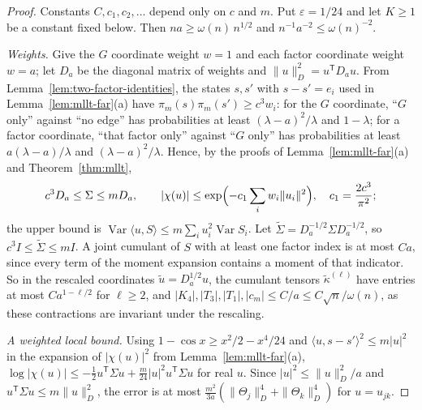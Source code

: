 \documentclass[11pt]{article}
\begin{document}
\begin{proof}
Constants \(C,c_1,c_2,\ldots\) depend only on \(c\) and \(m\).
Put \(\varepsilon=1/24\) and let \(K\ge1\) be a constant fixed below.
Then \(na\ge\omega(n)\,n^{1/2}\) and \(n^{-1}a^{-2}\le\omega(n)^{-2}\).

\emph{Weights.} Give the \(G\) coordinate weight \(w=1\) and each factor
coordinate weight \(w=a\); let \(D_a\) be the diagonal matrix of weights and
\(\|u\|_D^2=u^{\mathsf T}D_au\).
From Lemma~\ref{lem:two-factor-identities}, the states \(s,s'\) with
\(s-s'=e_i\) used in Lemma~\ref{lem:mllt-far}(a) have
\(\pi_m(s)\pi_m(s')\ge c^3w_i\): for the \(G\) coordinate,
``\(G\) only'' against ``no edge'' has probabilities at least \((\lambda-a)^2/\lambda\)
and \(1-\lambda\); for a factor coordinate, ``that factor only'' against
``\(G\) only'' has probabilities at least \(a(\lambda-a)/\lambda\) and
\((\lambda-a)^2/\lambda\).
Hence, by the proofs of Lemma~\ref{lem:mllt-far}(a) and Theorem~\ref{thm:mllt},
\[
c^3D_a\le\Sigma\le mD_a,
\qquad
|\chi(u)|\le\exp\Bigl(-c_1\sum_iw_i\|u_i\|^2\Bigr),\quad c_1=\frac{2c^3}{\pi^2};
\]
the upper bound is \(\operatorname{Var}\langle u,S\rangle\le m\sum_iu_i^2\operatorname{Var}S_i\).
Let \(\tilde\Sigma=D_a^{-1/2}\Sigma D_a^{-1/2}\), so \(c^3I\le\tilde\Sigma\le mI\).
A joint cumulant of \(S\) with at least one factor index is at most \(Ca\), since
every term of the moment expansion contains a moment of that indicator.
So in the rescaled coordinates \(\tilde u=D_a^{1/2}u\), the cumulant tensors
\(\tilde\kappa^{(\ell)}\) have entries at most \(Ca^{1-\ell/2}\) for \(\ell\ge2\), and
\(|K_4|,|T_3|,|T_1|,|c_m|\le C/a\le C\sqrt n/\omega(n)\), as these contractions are
invariant under the rescaling.

\emph{A weighted local bound.}
Using \(1-\cos x\ge x^2/2-x^4/24\) and \(\langle u,s-s'\rangle^2\le m|u|^2\) in the
expansion of \(|\chi(u)|^2\) from Lemma~\ref{lem:mllt-far}(a),
\(\log|\chi(u)|\le-\frac12u^{\mathsf T}\Sigma u+\frac m{24}|u|^2u^{\mathsf T}\Sigma u\) for
real \(u\).
Since \(|u|^2\le\|u\|_D^2/a\) and \(u^{\mathsf T}\Sigma u\le m\|u\|_D^2\), the error is at
most \(\frac{m^2}{3a}(\|\Theta_j\|_D^4+\|\Theta_k\|_D^4)\) for \(u=u_{jk}\).


\end{proof}
\end{document}
